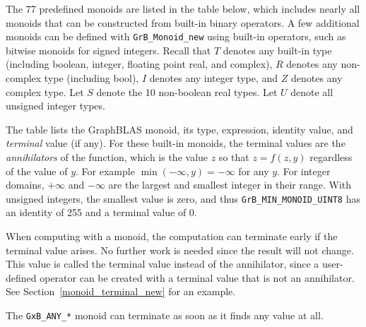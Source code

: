 \documentclass[12pt]{article}
\begin{document}
The 77 predefined monoids are listed in the table below, which
includes nearly all monoids that can be constructed from built-in binary
operators.  A few additional monoids can be defined with \verb'GrB_Monoid_new'
using built-in operators, such as bitwise monoids for signed integers.
Recall that $T$ denotes any built-in type (including boolean, integer, floating
point real, and complex), $R$ denotes any non-complex type (including bool),
$I$ denotes any integer type, and $Z$ denotes any complex type.  Let $S$ denote
the 10 non-boolean real types.  Let $U$ denote all unsigned integer types.

The table lists the GraphBLAS monoid, its type, expression, identity
value, and {\em terminal} value (if any).  For these built-in monoids, the
terminal values are the {\em annihilators} of the function, which is the value
$z$ so that $z=f(z,y)$ regardless of the value of $y$.  For example
$\min(-\infty,y) = -\infty$ for any $y$.  For integer domains, $+\infty$ and
$-\infty$ are the largest and smallest integer in their range.  With unsigned
integers, the smallest value is zero, and thus \verb'GrB_MIN_MONOID_UINT8' has an
identity of 255 and a terminal value of 0.

When computing with a monoid, the computation can terminate early if the
terminal value arises.  No further work is needed since the result will not
change.  This value is called the terminal value instead of the annihilator,
since a user-defined operator can be created with a terminal value that is not
an annihilator.  See Section~\ref{monoid_terminal_new} for an example.

The \verb'GxB_ANY_*' monoid can terminate as soon as it finds any value at all.
\end{document}
